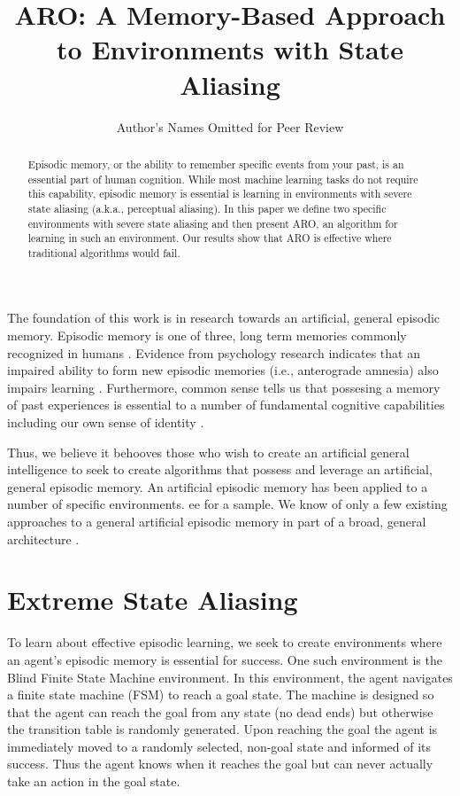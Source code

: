 \documentclass[letterpaper]{article} %
\title{ARO:  A Memory-Based Approach to Environments with State Aliasing }
\author{Author's Names Omitted for Peer Review
}
\begin{document}
\maketitle

\begin{abstract}
Episodic memory, or the ability to remember specific events from your
past, is an essential part of human cognition.  While most machine
learning tasks do not require this capability, episodic memory is
essential is learning in environments with severe state aliasing
(a.k.a., perceptual aliasing).  In this paper we define two specific
environments with severe state aliasing and then present ARO, an
algorithm for learning in such an environment.  Our results show that
ARO is effective where traditional algorithms would fail.
\end{abstract}

\noindent


The foundation of this work is in research towards an artificial,
general episodic memory.  Episodic memory is one of three, long term
memories commonly recognized in humans \cite{Tulving83}.  Evidence
from psychology research indicates that an impaired ability to form
new episodic memories (i.e., anterograde amnesia) also impairs
learning \cite{Brooks76}.  Furthermore, common sense tells us
that possesing a memory of past experiences is essential to a number
of fundamental cognitive capabilities including our own sense of
identity \cite{Holland10,Nuxoll12}.

Thus, we believe it behooves those who wish to create an artificial
general intelligence to seek to create algorithms that possess and
leverage an artificial, general episodic memory.  An artificial episodic
memory has been applied to a number of specific environments.
ee \cite{Tecuci07,Brom08,Castro10,Chaudhry18} for a sample.  We know
of only a few existing approaches to a general artificial episodic
memory in part of a broad, general
architecture \cite{Boloni11,Nuxoll12,Menager16}.




\section{Extreme State Aliasing}
To learn about effective episodic learning, we seek to create
environments where an agent's episodic memory is essential for
success.  One such environment is the Blind Finite State Machine
environment.  In this environment, the agent navigates a finite state
machine (FSM) \cite{Hopcroft06} to reach a goal state.  The machine is
designed so that the agent can reach the goal from any state (no dead
ends) but otherwise the transition table is randomly generated.  Upon
reaching the goal the agent is immediately moved to a randomly
selected, non-goal state and informed of its success.  Thus the agent
knows when it reaches the goal but can never actually take an action
in the goal state.
\end{document}
